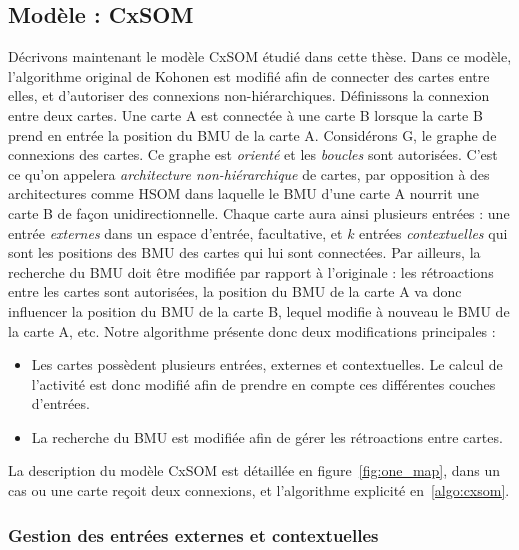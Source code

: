 \subsection{Modèle : CxSOM}

Décrivons maintenant le modèle CxSOM étudié dans cette thèse. Dans ce modèle, l'algorithme original de Kohonen est modifié afin de connecter des cartes entre elles, et d'autoriser des connexions non-hiérarchiques.
Définissons la connexion entre deux cartes. Une carte A est connectée à une carte B lorsque la carte B prend en entrée la position du BMU de la carte A. 
Considérons G, le graphe de connexions des cartes. Ce graphe est \emph{orienté} et les \emph{boucles} sont autorisées. C'est ce qu'on appelera \emph{architecture non-hiérarchique} de cartes, par opposition à des architectures comme HSOM dans laquelle le BMU d'une carte A nourrit une carte B de façon unidirectionnelle. 
Chaque carte aura ainsi plusieurs entrées : une entrée \emph{externes} dans un espace d'entrée, facultative, et $k$ entrées \emph{contextuelles} qui sont les positions des BMU des cartes qui lui sont connectées. Par ailleurs, la recherche du BMU doit être modifiée par rapport à l'originale : les rétroactions entre les cartes sont autorisées, la position du BMU de la carte A va donc influencer la position du BMU de la carte B, lequel modifie à nouveau le BMU de la carte A, etc. 
Notre algorithme présente donc deux modifications principales : 
\begin{itemize}
\item Les cartes possèdent plusieurs entrées, externes et contextuelles. Le calcul de l'activité est donc modifié afin de prendre en compte ces différentes couches d'entrées.
\item La recherche du BMU est modifiée afin de gérer les rétroactions entre cartes.
\end{itemize}

La description du modèle CxSOM est détaillée en figure~\ref{fig:one_map}, dans un cas ou une carte reçoit deux connexions, et l'algorithme explicité en~\ref{algo:cxsom}.


\subsubsection{Gestion des entrées externes et contextuelles}


